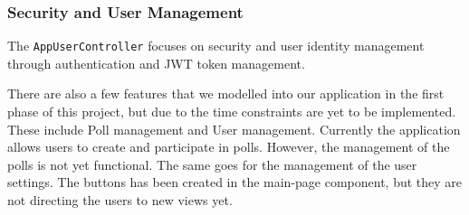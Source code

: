 \subsubsection{Security and User Management}
The \texttt{AppUserController} focuses on security and user identity management through authentication and JWT token management.

\hfill \break

There are also a few features that we modelled into our application in the first phase of this project,
but due to the time constraints are yet to be implemented. These include Poll management and User
management. Currently the application allows users to create and participate in polls. However, the
management of the polls is not yet functional. The same goes for the management of the user
settings. The buttons has been created in the main-page component, but they are not directing the
users to new views yet.